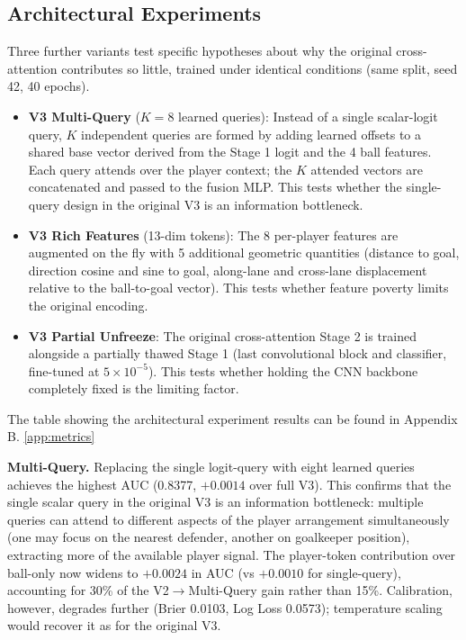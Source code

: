\subsection{Architectural Experiments}\label{sec:v3_arch_experiments}

Three further variants test specific hypotheses about why the original cross-attention contributes so little, trained under identical conditions (same split, seed 42, 40 epochs).

\begin{itemize}
    \item \textbf{V3 Multi-Query} ($K = 8$ learned queries): Instead of a single scalar-logit query, $K$ independent queries are formed by adding learned offsets to a shared base vector derived from the Stage 1 logit and the 4 ball features. Each query attends over the player context; the $K$ attended vectors are concatenated and passed to the fusion MLP. This tests whether the single-query design in the original V3 is an information bottleneck.
    \item \textbf{V3 Rich Features} (13-dim tokens): The 8 per-player features are augmented on the fly with 5 additional geometric quantities (distance to goal, direction cosine and sine to goal, along-lane and cross-lane displacement relative to the ball-to-goal vector). This tests whether feature poverty limits the original encoding.
    \item \textbf{V3 Partial Unfreeze}: The original cross-attention Stage 2 is trained alongside a partially thawed Stage 1 (last convolutional block and classifier, fine-tuned at $5 \times 10^{-5}$). This tests whether holding the CNN backbone completely fixed is the limiting factor.
\end{itemize}

The table showing the architectural experiment results can be found in Appendix B. \ref{app:metrics}

\textbf{Multi-Query.} Replacing the single logit-query with eight learned queries achieves the highest AUC (0.8377, $+0.0014$ over full V3). This confirms that the single scalar query in the original V3 is an information bottleneck: multiple queries can attend to different aspects of the player arrangement simultaneously (one may focus on the nearest defender, another on goalkeeper position), extracting more of the available player signal. The player-token contribution over ball-only now widens to $+0.0024$ in AUC (vs $+0.0010$ for single-query), accounting for 30\% of the V2$\to$Multi-Query gain rather than 15\%. Calibration, however, degrades further (Brier 0.0103, Log Loss 0.0573); temperature scaling would recover it as for the original V3.

